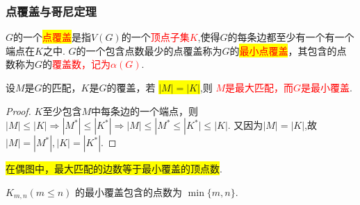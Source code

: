 \subsubsection{点覆盖与哥尼定理}
\begin{definition}
	$G$的一个\colorbox{yellow}{\textcolor{red}{点覆盖}}是指$V(G)$的一个\textcolor{red}{顶点子集$K$},使得$G$的每条边都至少有一个有一个端点在$K$之中. $G$的一个包含点数最少的点覆盖称为$G$的\colorbox{yellow}{\textcolor{red}{最小点覆盖}}，其包含的点数称为$G$的\textcolor{red}{覆盖数，记为$\alpha(G)$}.
\end{definition}

\begin{theorem}
	设$M$是$G$的匹配，$K$是$G$的覆盖，若	\colorbox{yellow}{$|M|=|K|$},则
	\textcolor{red}{$M$是最大匹配，而$G$是最小覆盖}.
\end{theorem}
\begin{proof}
	$K$至少包含$M$中每条边的一个端点，则$|M|\leq |K|\Rightarrow |M^{*} |\leq |K^{*}|\Rightarrow |M|\leq |M^{*} \leq |K^{*}| \leq |K|$. 又因为$|M|=|K|$,故$|M|=|M^{*} |, |K|=|K^{*}|$.
\end{proof}


\begin{theorem}[哥尼，1931]
	\colorbox{yellow}{在偶图中，最大匹配的边数等于最小覆盖的顶点数}.
\end{theorem}

\begin{note}
	 $K_{m,n}(m \leq n)$ 的最小覆盖包含的点数为 $\min\{m, n\}$.
\end{note}

